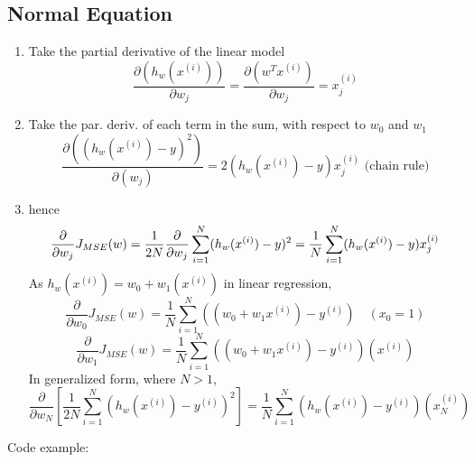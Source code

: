 \documentclass{article}
\begin{document}
\subsection{Normal Equation}
\begin{enumerate}
    \item Take the partial derivative of the linear model
    \begin{equation}
        \frac{\partial(h_w(x^{(i)}))}{\partial w_j} = \frac{\partial(w^Tx^{(i)})}{\partial w_j} = x_j^{(i)}    
    \end{equation}
    \item Take the par. deriv. of each term in the sum, with respect to $w_0$ and $w_1$
    \begin{equation}
        \frac{\partial((h_w(x^{(i)})-y)^2)}{\partial(w_j)} = 2 (h_w(x^{(i)}) - y) x_j^{(i)}  \text{     (chain rule)}
    \end{equation}
    \item hence
    \begin{equation}
        \frac{\partial}{\partial w_j} J_{MSE}(w) = \frac{1}{2N} \frac{\partial}{\partial w_j}\sum_{i=1}^{N}(h_w(x^{(i)})-y)^2 \\
        = \frac{1}{N} \sum_{i=1}^{N}(h_w(x^{(i)}) - y) x_j^{(i)}
    \end{equation}
    As \(h_w(x^{(i)}) = w_0 + w_1(x^{(i)})\) in linear regression,
    \[\frac{\partial }{\partial w_0} J_{MSE}(w)= \frac{1}{N} \sum_{i=1}^{N}((w_0 + w_1 x^{(i)}) - y^{(i)}) \quad {(x_0 = 1)}\]
    \[\frac{\partial }{\partial w_1} J_{MSE}(w)= \frac{1}{N} \sum_{i=1}^{N}((w_0 + w_1 x^{(i)}) - y^{(i)})(x^{(i)})\]
    In generalized form, where $N > 1$, 
    \[\frac{\partial }{\partial w_N} \left[ \frac{1}{2N} \sum_{i=1}^{N} \left(h_w(x^{(i)}) - y^{(i)}\right)^2 \right]= \frac{1}{N} \sum_{i=1}^{N}(h_w(x^{(i)}) - y^{(i)})(x_N^{(i)})\]
\end{enumerate}
Code example:
\end{document}
